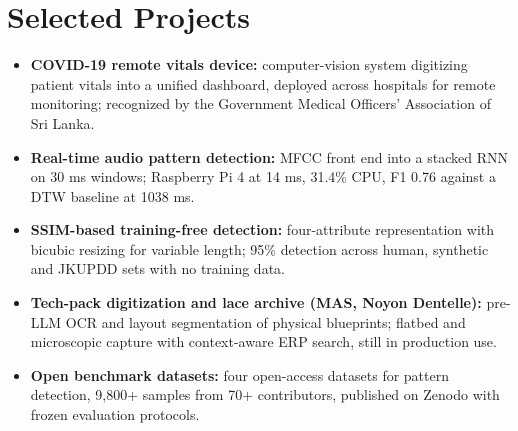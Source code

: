 \documentclass[11pt]{article}
\begin{document}
\section*{Selected Projects \footnotesize {}}
\begin{itemize}[leftmargin=1.2em, itemsep=-0.25em]
    \item \textbf{COVID-19 remote vitals device:} computer-vision system digitizing patient vitals into a unified dashboard, deployed across hospitals for remote monitoring; recognized by the Government Medical Officers' Association of Sri Lanka.
    \item \textbf{Real-time audio pattern detection:} MFCC front end into a stacked RNN on 30 ms windows; Raspberry Pi 4 at 14 ms, 31.4\% CPU, F1 0.76 against a DTW baseline at 1038 ms.
    \item \textbf{SSIM-based training-free detection:} four-attribute representation with bicubic resizing for variable length; 95\% detection across human, synthetic and JKUPDD sets with no training data.
    \item \textbf{Tech-pack digitization and lace archive (MAS, Noyon Dentelle):} pre-LLM OCR and layout segmentation of physical blueprints; flatbed and microscopic capture with context-aware ERP search, still in production use.

    
    
    \item \textbf{Open benchmark datasets:} four open-access datasets for pattern detection, 9,800+ samples from 70+ contributors, published on Zenodo with frozen evaluation protocols.
\end{itemize}

\enlargethispage{3\baselineskip}
\vspace{-0.5em}
\end{document}
